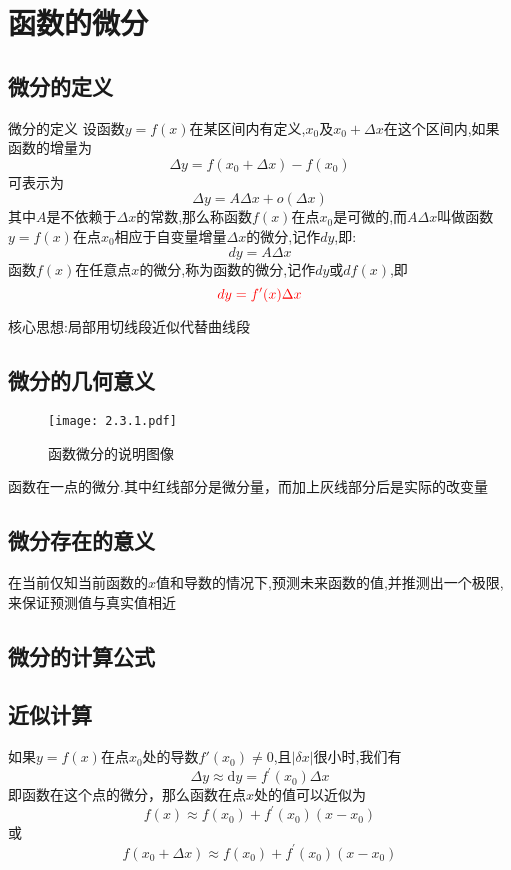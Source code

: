 \documentclass[12pt, a4paper, oneside, UTF8]{ctexbook}  %
\begin{document}
\begin{sloppypar}

    \else
    \fi
    \chapter{函数的微分}

    \section{微分的定义}
    \begin{defn}{微分的定义}{}
        设函数$y=f(x)$在某区间内有定义,$x_0$及$x_0+\Delta x$在这个区间内,如果函数的增量为
        $$
            \Delta y = f ( x _ { 0 } + \Delta x ) - f ( x _ { 0 } )
        $$
        可表示为
        $$
            \Delta y = A \Delta x + o ( \Delta x )
        $$
        其中$A$是不依赖于$\Delta x$的常数,那么称函数$f(x)$在点$x_0$是可微的,而$A\Delta x$叫做函数$y=f(x)$在点$x_0$相应于自变量增量$\Delta x$​的微分,记作$dy$,即:
        $$
            d y =  A\Delta x
        $$
        函数$f(x)$在任意点$x$的微分,称为函数的微分,记作$dy$或$df(x)$,即
        $$
            \textcolor{red}{d y = f ^ { \prime } ( x ) \Delta x}
        $$
    \end{defn}
    核心思想:局部用切线段近似代替曲线段
    \section{微分的几何意义}
    \begin{figure}[H]
        \centering \texttt{[image: 2.3.1.pdf]} \caption{函数微分的说明图像}
    \end{figure}
    函数在一点的微分.其中红线部分是微分量，而加上灰线部分后是实际的改变量
    \section{微分存在的意义}
    在当前仅知当前函数的$x$值和导数的情况下,预测未来函数的值,并推测出一个极限,来保证预测值与真实值相近
    \section{微分的计算公式}

    \section{近似计算}
    \begin{defn}{}{}
        如果$y=f(x)$在点$x_0$处的导数$f'(x_0)\neq 0$,且$|\delta x|$很小时,我们有
        $$
            \Delta y\approx\mathrm{d}y=f^{\prime}\left(x_{0}\right)\Delta x
        $$
        即函数在这个点的微分，那么函数在点$x$处的值可以近似为
        $$
            f(x)\approx f(x_{0})+f^{\prime}(x_{0})(x-x_{0})
        $$
        或
        $$
            f(x_0+\Delta x) \approx f(x_{0})+f^{\prime}(x_{0})(x-x_{0})
        $$
    \end{defn}
    \ifx\allfiles\undefined
\end{sloppypar}
\end{document}

